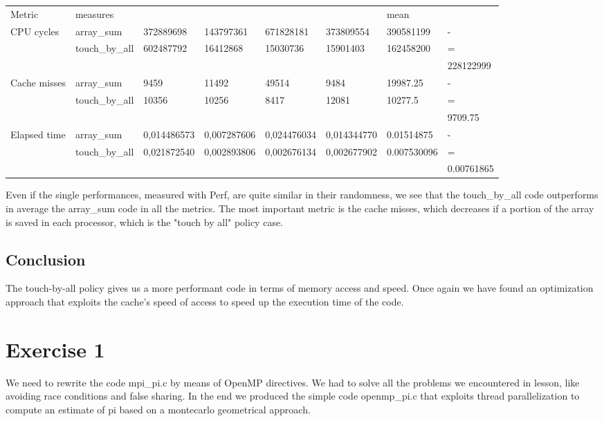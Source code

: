 \documentclass{article}
\begin{document}
\begin{adjustwidth}{-3cm}{}
\begin{tabular}[H]{l|l |l l l l| l l}
Metric & measures&&&&&mean&\\
CPU cycles& array\_sum &372889698& 143797361&671828181&373809554&390581199&-\\
          & touch\_by\_all&602487792&16412868&15030736&15901403&162458200&= \\
&&&&&&&	228122999\\				
					\hline
Cache misses & array\_sum&9459& 11492&49514&9484&19987.25&-\\
          & touch\_by\_all& 10356&10256 & 8417&12081&10277.5&=\\
&&&&&&&	 9709.75\\				
\hline
Elapsed time   & array\_sum& 0,014486573&0,007287606&0,024476034& 0,014344770&0.01514875&- \\
          & touch\_by\_all &0,021872540&0,002893806&0,002676134&0,002677902&0.007530096&=\\
					&&&&&&&	 0.00761865\\				
\hline
\end{tabular}
\end{adjustwidth}
Even if the single performances, measured with Perf, are quite similar in their randomness, we see that the touch\_by\_all code outperforms in average the array\_sum code in all the metrics. The most important metric is the cache misses, which decreases if a portion of the array is saved in each processor, which is the "touch by all" policy case.
\subsection{Conclusion}
The touch-by-all policy gives us a more performant code in terms of memory access and speed.
Once again we have found an optimization approach that exploits the cache's speed of access to speed up the execution time of the code.

\section{Exercise 1}

We need to rewrite the code mpi\_pi.c by means of OpenMP directives. We had to solve all the problems we encountered in lesson, like avoiding race conditions and false sharing.
In the end we produced the simple code openmp\_pi.c that exploits thread parallelization to compute an estimate of pi based on a montecarlo geometrical approach.
\end{document}
